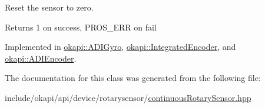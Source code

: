 Reset the sensor to zero.

\begin{DoxyReturn}{Returns}
1 on success, P\+R\+O\+S\+\_\+\+E\+RR on fail 
\end{DoxyReturn}


Implemented in \mbox{\hyperlink{classokapi_1_1ADIGyro_a316eec0bf6008c50fea6d1a621fd2e87}{okapi\+::\+A\+D\+I\+Gyro}}, \mbox{\hyperlink{classokapi_1_1IntegratedEncoder_a1f95f00f59911a87a9a38633343f4311}{okapi\+::\+Integrated\+Encoder}}, and \mbox{\hyperlink{classokapi_1_1ADIEncoder_a8df70f75e1f23aa03eaa3e331fcab381}{okapi\+::\+A\+D\+I\+Encoder}}.



The documentation for this class was generated from the following file\+:\begin{DoxyCompactItemize}
\item 
include/okapi/api/device/rotarysensor/\mbox{\hyperlink{continuousRotarySensor_8hpp}{continuous\+Rotary\+Sensor.\+hpp}}\end{DoxyCompactItemize}
